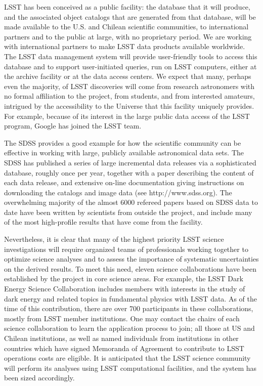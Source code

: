 \documentclass{emulateapj}
\begin{document}
LSST has been conceived as a public facility: the database that it will
produce, and the associated object catalogs that are generated from that
database, will be made available to the U.S. and Chilean scientific communities,
to international partners and to the public at large, with no proprietary period. 
We are working with international partners 
to make LSST data products available worldwide. The LSST data management 
system will provide user-friendly tools to access this database and to support
user-initiated queries, run on LSST computers, either at the archive facility 
or at the data access centers. We expect that many, perhaps even the majority,
of LSST discoveries will come from research astronomers with no formal
affiliation to the project, from students, and from interested amateurs, 
intrigued by the accessibility to the Universe that this facility uniquely 
provides. For example, because of its interest in the large public data access 
of the LSST program, Google has joined the LSST team. 

The SDSS provides a good example for how the scientific 
community can be effective in working with large, publicly available
astronomical data sets. The SDSS has published a series of large incremental
data releases via a sophisticated database, roughly once per year, together with 
a paper describing the content of each data release, and extensive on-line 
documentation giving instructions on downloading the catalogs and image data
(see http://www.sdss.org). The overwhelming majority of the almost
6000 refereed papers based 
on SDSS data to date have been written by scientists from outside 
the project, and  include many of the most high-profile results that have come 
from the facility. 

Nevertheless, it is clear that many of the highest priority LSST science
investigations will require organized teams of professionals working together
to optimize science analyses and to assess the importance of systematic 
uncertainties on the derived results. To meet this need, eleven science
collaborations have been established by the project in core science
areas. For example, the LSST Dark Energy Science Collaboration includes
members with interests in the study of dark energy and related topics in 
fundamental physics with LSST data. As of the time of this contribution, there are 
over 700 participants in these collaborations, mostly from LSST member institutions. 
One may contact the chairs of each science collaboration to learn the
application process to join; all those at US and Chilean institutions,
as well as named individuals from institutions in other countries
which have signed Memoranda of Agreement to contribute to LSST
operations costs are eligible.  
It is anticipated that the LSST science community  will perform its
analyses using  
LSST computational facilities, and the system has been sized accordingly. 
\end{document}
